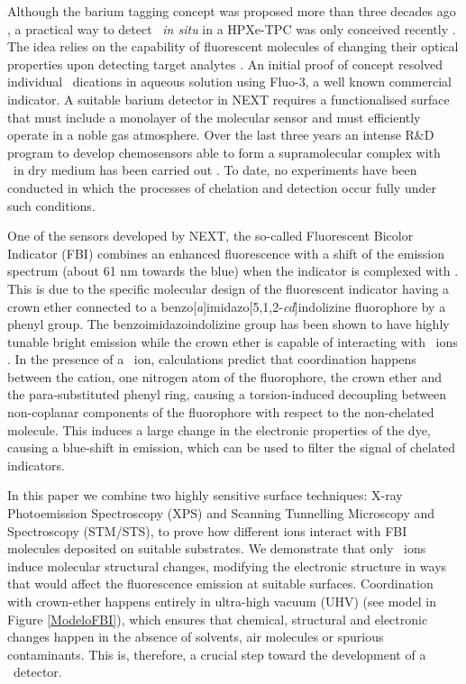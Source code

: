 \documentclass[aps,prl,reprint,longbibliography,superscriptaddress, english]{revtex4-1}
\begin{document}
Although the barium tagging concept was proposed more than three decades ago \cite{Moe:1991ik}, a practical way to detect \Bapp\ {\it in situ} in a HPXe-TPC was only conceived recently \cite{Nygren_2015, Jones:2016qiq}. The idea relies on the capability of fluorescent molecules of changing their optical properties upon detecting target analytes \cite{valeur_chemical,wolfbeis_materials_2005}. An initial proof of concept \cite{McDonald:2017izm} resolved individual \Bapp\ dications in aqueous solution using Fluo-3, a well known commercial indicator. A suitable barium detector in NEXT requires a functionalised surface that must include a monolayer of the molecular sensor and must efficiently operate in a noble gas atmosphere. Over the last three years an intense R\&D program to develop chemosensors able to form a supramolecular complex with \Bapp\ in dry medium has been carried out \cite{Thapa:2019zjk, rivilla_fluorescent_2020,thapa_demonstration_2021}. To date, no experiments have been conducted in which the processes of chelation and detection occur fully under such conditions.

One of the sensors developed by NEXT, the so-called
Fluorescent Bicolor Indicator (FBI) \cite{rivilla_fluorescent_2020} combines an enhanced fluorescence with a shift of the emission spectrum (about 61 nm towards the blue) when the indicator is complexed with \Bapp.  This is due to the specific molecular design of the fluorescent indicator having a crown ether connected to a benzo[\textit{a}]imidazo[5,1,2-\textit{cd}]indolizine fluorophore by a phenyl group. The benzoimidazoindolizine group has been shown to have highly tunable bright emission \cite{Stasyuk_benzo,Levesque_general} while the crown ether is capable of interacting with \Bapp\ ions \cite{valeur_chemical,maleknia_cavity-size-dependent_2002}. In the presence of a \Bapp\ ion, calculations predict that coordination happens between the cation, one nitrogen atom of the fluorophore, the crown ether and the para-substituted phenyl ring, causing a  {torsion-induced decoupling between non-coplanar components of the fluorophore with respect} to the non-chelated molecule. This induces a large change in the electronic properties of the dye, causing a blue-shift in emission, which can be used to filter the signal of chelated indicators.

In this paper we combine two highly sensitive surface techniques: X-ray Photoemission Spectroscopy (XPS) and Scanning Tunnelling Microscopy and Spectroscopy (STM/STS), to prove how different ions interact with FBI molecules deposited on suitable substrates. We demonstrate that only \Bapp\ ions induce molecular structural changes, modifying the electronic structure in ways that would affect the fluorescence emission at suitable surfaces. Coordination with crown-ether happens entirely in ultra-high vacuum (UHV) (see model in Figure {\ref{ModeloFBI}}), which ensures that chemical, structural and electronic changes happen in the absence of solvents, air molecules or spurious contaminants. This is, therefore, a crucial step toward the development of a \Bapp\ detector. 
\end{document}
